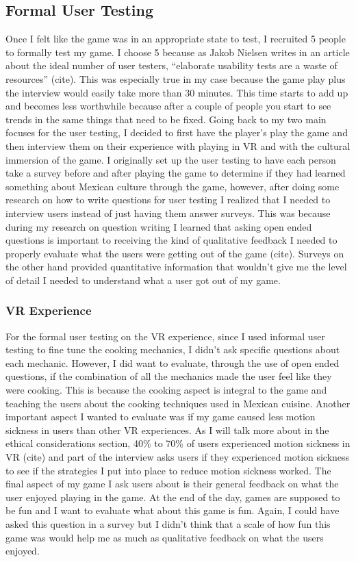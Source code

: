 \documentclass[10pt,twocolumn]{article}
\begin{document}
\subsection{Formal User Testing}
Once I felt like the game was in an appropriate state to test, I recruited 5 people to formally test my game. I choose 5 because as Jakob Nielsen writes in an article about the ideal number of user testers, “elaborate usability tests are a waste of resources” (cite). This was especially true in my case because the game play plus the interview would easily take more than 30 minutes. This time starts to add up and becomes less worthwhile because after a couple of people you start to see trends in the same things that need to be fixed. Going back to my two main focuses for the user testing, I decided to first have the player’s play the game and then interview them on their experience with playing in VR and with the cultural immersion of the game. 
I originally set up the user testing to have each person take a survey before and after playing the game to determine if they had learned something about Mexican culture through the game, however, after doing some research on how to write questions for user testing I realized that I needed to interview users instead of just having them answer surveys. This was because during my research on question writing I learned that asking open ended questions is important to receiving the kind of qualitative feedback I needed to properly evaluate what the users were getting out of the game (cite). Surveys on the other hand provided quantitative information that wouldn’t give me the level of detail I needed to understand what a user got out of my game.

\subsubsection{VR Experience}
For the formal user testing on the VR experience, since I used informal user testing to fine tune the cooking mechanics, I didn't ask specific questions about each mechanic. However, I did want to evaluate, through the use of open ended questions, if the combination of all the mechanics made the user feel like they were cooking. This is because the cooking aspect is integral to the game and teaching the users about the cooking techniques used in Mexican cuisine. Another important aspect I wanted to evaluate was if my game caused less motion sickness in users than other VR experiences. As I will talk more about in the ethical considerations section, 40\% to 70\% of users experienced motion sickness in VR (cite) and part of the interview asks users if they experienced motion sickness to see if the strategies I put into place to reduce motion sickness worked. The final aspect of my game I ask users about is their general feedback on what the user enjoyed playing in the game. At the end of the day, games are supposed to be fun and I want to evaluate what about this game is fun. Again, I could have asked this question in a survey but I didn’t think that a scale of how fun this game was would help me as much as qualitative feedback on what the users enjoyed.
\end{document}

